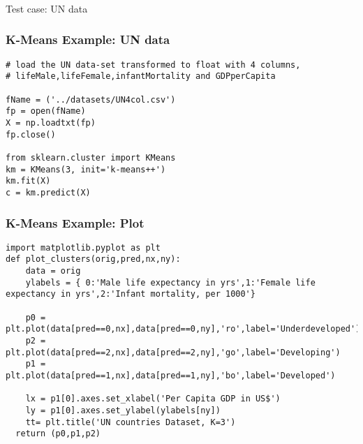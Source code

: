 \begin{frame}[fragile]\frametitle{}
\begin{center}
{\Large Test case: UN data}
\end{center}
\end{frame}

\begin{frame}[fragile]\frametitle{K-Means Example: UN data}
\begin{lstlisting}
# load the UN data-set transformed to float with 4 columns, 
# lifeMale,lifeFemale,infantMortality and GDPperCapita

fName = ('../datasets/UN4col.csv')
fp = open(fName)
X = np.loadtxt(fp)
fp.close()

from sklearn.cluster import KMeans
km = KMeans(3, init='k-means++') 
km.fit(X)
c = km.predict(X) 
\end{lstlisting}
\end{frame}

\begin{frame}[fragile]\frametitle{K-Means Example: Plot}
\begin{lstlisting}
import matplotlib.pyplot as plt
def plot_clusters(orig,pred,nx,ny):
	data = orig
	ylabels = { 0:'Male life expectancy in yrs',1:'Female life expectancy in yrs',2:'Infant mortality, per 1000'}

	p0 = plt.plot(data[pred==0,nx],data[pred==0,ny],'ro',label='Underdeveloped')
	p2 = plt.plot(data[pred==2,nx],data[pred==2,ny],'go',label='Developing') 
	p1 = plt.plot(data[pred==1,nx],data[pred==1,ny],'bo',label='Developed') 

	lx = p1[0].axes.set_xlabel('Per Capita GDP in US$')
	ly = p1[0].axes.set_ylabel(ylabels[ny])
	tt= plt.title('UN countries Dataset, K=3')
  return (p0,p1,p2)
\end{lstlisting}
\end{frame}


